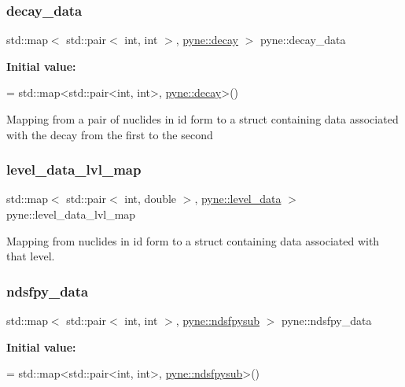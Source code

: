 \mbox{\label{namespacepyne_ac880c3701eca3453cb9cdfab30195d65}} 
\subsubsection{\texorpdfstring{decay\+\_\+data}{decay\_data}}
{\footnotesize\ttfamily std\+::map$<$ std\+::pair$<$ int, int $>$, \hyperlink{structpyne_1_1decay}{pyne\+::decay} $>$ pyne\+::decay\+\_\+data}

{\bfseries Initial value\+:}
\begin{DoxyCode}
= 
  std::map<std::pair<int, int>, \hyperlink{structpyne_1_1decay}{pyne::decay}>()
\end{DoxyCode}
Mapping from a pair of nuclides in id form to a struct containing data associated with the decay from the first to the second \mbox{\label{namespacepyne_aa5b6136e3970959756640b867754bb62}} 
\subsubsection{\texorpdfstring{level\+\_\+data\+\_\+lvl\+\_\+map}{level\_data\_lvl\_map}}
{\footnotesize\ttfamily std\+::map$<$ std\+::pair$<$ int, double $>$, \hyperlink{structpyne_1_1level__data}{pyne\+::level\+\_\+data} $>$ pyne\+::level\+\_\+data\+\_\+lvl\+\_\+map}

Mapping from nuclides in id form to a struct containing data associated with that level. \mbox{\label{namespacepyne_a0526a4bf1637612d760c106836475c6d}} 
\subsubsection{\texorpdfstring{ndsfpy\+\_\+data}{ndsfpy\_data}}
{\footnotesize\ttfamily std\+::map$<$ std\+::pair$<$ int, int $>$, \hyperlink{structpyne_1_1ndsfpysub}{pyne\+::ndsfpysub} $>$ pyne\+::ndsfpy\+\_\+data}

{\bfseries Initial value\+:}
\begin{DoxyCode}
= 
  std::map<std::pair<int, int>, \hyperlink{structpyne_1_1ndsfpysub}{pyne::ndsfpysub}>()
\end{DoxyCode}
\mbox{\label{namespacepyne_af7b850fa105454bc35f4167d41071239}} 
